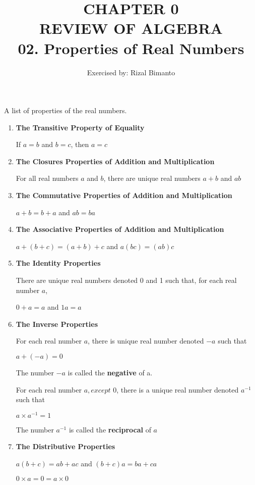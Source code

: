 \documentclass{article}
\title{CHAPTER 0\\
REVIEW OF ALGEBRA\\ 
02. Properties of Real Numbers
}
\author{Exercised by: Rizal Bimanto}
\date{}
\begin{document}
\maketitle

A list of properties of the real numbers.

\begin{enumerate}
    \item \textbf{The Transitive Property of Equality}\par
    \begin{center}
        If $a = b$ and $b = c$, then $a = c$
    \end{center}
    
    \item \textbf{The Closures Properties of Addition and Multiplication}\par
    For all real numbers $a$ and $b$,
    there are unique real numbers $a + b$ and $ab$

    \item \textbf{The Commutative Properties of Addition and Multiplication}\par
    \begin{center}
        $a + b = b + a$ and $ab = ba$
    \end{center}

    \item \textbf{The Associative Properties of Addition and Multiplication}\par
    \begin{center}
        $a + (b + c) = (a + b) + c$ and $a(bc) = (ab)c$
    \end{center}

    \item \textbf{The Identity Properties}\par
    There are unique real numbers denoted 0 and 1 such that, for each real number $a$,\par
    \begin{center}
        $0 + a = a$ and $1a = a$
    \end{center}

    \item \textbf{The Inverse Properties}\par
    For each real number $a$, there is unique real number denoted $-a$ such that
    \begin{center}
        $a + (-a) = 0$
    \end{center}
    The number $-a$ is called the \textbf{negative} of a.\par
    For each real number $a, except$ 0, there is a unique real number denoted $a^{-1}$ such that
    \begin{center}
        $a \times a^{-1} = 1$
    \end{center}
    The number $a^{-1}$ is called the \textbf{reciprocal} of $a$

    \item \textbf{The Distributive Properties}\par
    \begin{center}
        $a(b + c) = ab + ac$ and $(b + c)a = ba + ca$\par
        $0 \times a = 0 = a \times 0$
    \end{center}
\end{enumerate}
\end{document}
